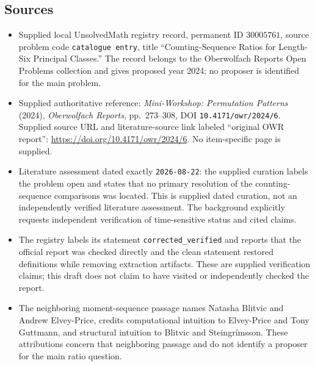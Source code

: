 \documentclass[11pt]{article}
\begin{document}
\subsection{Sources}
\begin{itemize}
\item Supplied local UnsolvedMath registry record, permanent ID \(30005761\), source problem code \texttt{catalogue entry}, title ``Counting-Sequence Ratios for Length-Six Principal Classes.'' The record belongs to the Oberwolfach Reports Open Problems collection and gives proposed year 2024; no proposer is identified for the main problem.
\item Supplied authoritative reference: \emph{Mini-Workshop: Permutation Patterns} (2024), \emph{Oberwolfach Reports}, pp.~273--308, DOI \texttt{10.4171/owr/2024/6}. Supplied source URL and literature-source link labeled ``original OWR report'': \url{https://doi.org/10.4171/owr/2024/6}. No item-specific page is supplied.
\item Literature assessment dated exactly \texttt{2026-08-22}: the supplied curation labels the problem open and states that no primary resolution of the counting-sequence comparisons was located. This is supplied dated curation, not an independently verified literature assessment. The background explicitly requests independent verification of time-sensitive status and cited claims.
\item The registry labels its statement \texttt{corrected\_verified} and reports that the official report was checked directly and the clean statement restored definitions while removing extraction artifacts. These are supplied verification claims; this draft does not claim to have visited or independently checked the report.
\item The neighboring moment-sequence passage names Natasha Blitvic and Andrew Elvey-Price, credits computational intuition to Elvey-Price and Tony Guttmann, and structural intuition to Blitvic and Steingr\'{i}msson. These attributions concern that neighboring passage and do not identify a proposer for the main ratio question.
\end{itemize}
\end{document}
